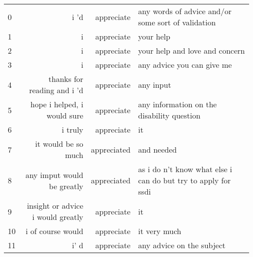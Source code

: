 \begin{table}
\begin{tabular}{lrrl}
\toprule
0  &                                                                                  i 'd     &    appreciate &   any words of advice and/or some sort of validation             \\
1  &                                                                                     i     &    appreciate &   your help                                                      \\
2  &                                                                                     i     &    appreciate &   your help and love and concern                                 \\
3  &                                                                                     i     &    appreciate &   any advice you can give me                                     \\
4  &                                                          thanks for reading and i 'd      &    appreciate &   any input                                                      \\
5  &                                                          hope i helped, i would sure      &    appreciate &   any information on the disability question                     \\
6  &                                                                               i truly     &    appreciate &   it                                                             \\
7  &                                                                    it would be so much    &   appreciated &   and needed                                                     \\
8  &                                                            any imput would be greatly     &   appreciated &   as i do n't know what else i can do but try to apply for ssdi  \\
9  &                                                         insight or advice i would greatly &    appreciate &   it                                                             \\
10 &                                                                     i of course would     &    appreciate &   it very much                                                   \\
11 &                                                                                    i' d   &    appreciate &   any advice on the subject                                      \\

\end{tabular}
\end{table}
